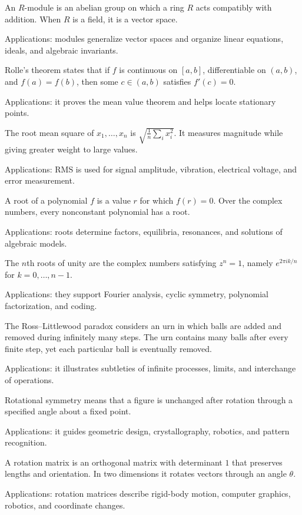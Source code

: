 An $R$-module is an abelian group on which a ring $R$ acts compatibly with addition. When $R$ is a field, it is a vector space. \par\noindent Applications: modules generalize vector spaces and organize linear equations, ideals, and algebraic invariants.

Rolle's theorem states that if $f$ is continuous on $[a,b]$, differentiable on $(a,b)$, and $f(a)=f(b)$, then some $c\in(a,b)$ satisfies $f'(c)=0$. \par\noindent Applications: it proves the mean value theorem and helps locate stationary points.

The root mean square of $x_1,\ldots,x_n$ is $\sqrt{\frac1n\sum_i x_i^2}$. It measures magnitude while giving greater weight to large values. \par\noindent Applications: RMS is used for signal amplitude, vibration, electrical voltage, and error measurement.

A root of a polynomial $f$ is a value $r$ for which $f(r)=0$. Over the complex numbers, every nonconstant polynomial has a root. \par\noindent Applications: roots determine factors, equilibria, resonances, and solutions of algebraic models.

The $n$th roots of unity are the complex numbers satisfying $z^n=1$, namely $e^{2\pi ik/n}$ for $k=0,\ldots,n-1$. \par\noindent Applications: they support Fourier analysis, cyclic symmetry, polynomial factorization, and coding.

The Ross--Littlewood paradox considers an urn in which balls are added and removed during infinitely many steps. The urn contains many balls after every finite step, yet each particular ball is eventually removed. \par\noindent Applications: it illustrates subtleties of infinite processes, limits, and interchange of operations.

Rotational symmetry means that a figure is unchanged after rotation through a specified angle about a fixed point. \par\noindent Applications: it guides geometric design, crystallography, robotics, and pattern recognition.

A rotation matrix is an orthogonal matrix with determinant $1$ that preserves lengths and orientation. In two dimensions it rotates vectors through an angle $\theta$. \par\noindent Applications: rotation matrices describe rigid-body motion, computer graphics, robotics, and coordinate changes.

